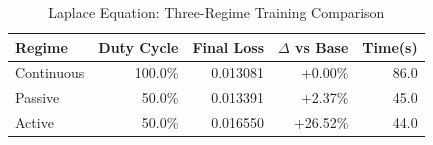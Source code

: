 \begin{table}[htbp]
\centering
\caption{Laplace Equation: Three-Regime Training Comparison}
\label{tab:laplace_regimes}
\begin{tabular}{lrrrr}
\hline
Regime & Duty Cycle & Final Loss & $\Delta$ vs Base & Time(s) \\
\hline
Continuous & 100.0\% & 0.013081 & +0.00\% & 86.0 \\
Passive & 50.0\% & 0.013391 & +2.37\% & 45.0 \\
Active & 50.0\% & 0.016550 & +26.52\% & 44.0 \\
\hline
\end{tabular}
\end{table}
